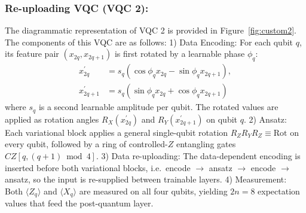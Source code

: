 \documentclass[runningheads]{llncs}
\begin{document}
\subsubsection{Re-uploading VQC (VQC 2): } The diagrammatic representation of VQC 2 is provided in Figure~\ref{fig:custom2}. The components of this VQC are as follows: 1) Data Encoding: For each qubit $q$, its feature pair $(x_{2q}, x_{2q+1})$ is first rotated by a learnable phase $\phi_q$:
    \begin{align}
    x_{2q}^{\prime} &= s_q (\cos \phi_q x_{2q} - \sin \phi_q x_{2q+1}) ,\\
    x_{2q+1}^{\prime} &= s_q (\sin \phi_q x_{2q} + \cos \phi_q x_{2q+1})
    \end{align}
where $s_q$ is a second learnable amplitude per qubit. The rotated values are applied as rotation angles $R_X(x_{2q}^{\prime})$ and $R_Y(x_{2q+1}^{\prime})$ on qubit $q$. 2) Ansatz: Each variational block applies a general single-qubit rotation $R_Z R_Y R_Z \equiv \text{Rot}$ on every qubit, followed by a ring of controlled-$Z$ entangling gates $CZ[q, (q+1) \bmod 4]$. 3) Data re-uploading: The data-dependent encoding is inserted before both variational blocks, i.e.\ encode $\rightarrow$ ansatz $\rightarrow$ encode $\rightarrow$ ansatz, so the input is re-supplied between trainable layers. 4) Measurement: Both $\langle Z_q \rangle$ and $\langle X_q \rangle$ are measured on all four qubits, yielding $2n=8$ expectation values that feed the post-quantum layer.
\end{document}
